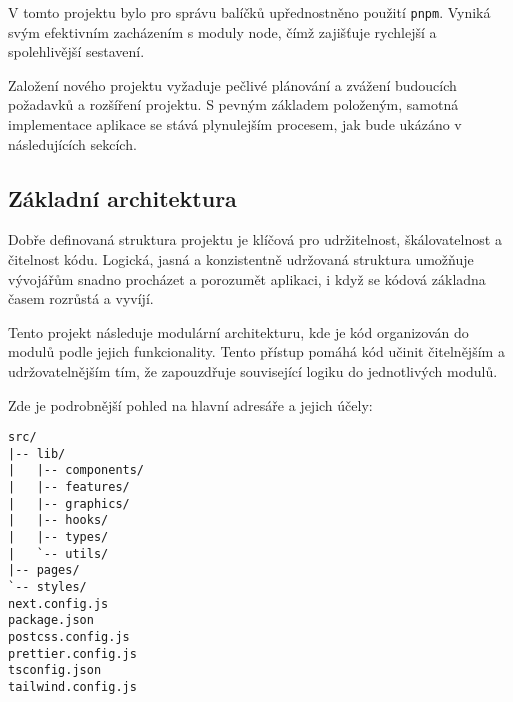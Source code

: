 V tomto projektu bylo pro správu balíčků upřednostněno použití \texttt{pnpm}.
Vyniká svým efektivním zacházením s moduly node, čímž zajišťuje rychlejší a spolehlivější sestavení.

Založení nového projektu vyžaduje pečlivé plánování a zvážení budoucích požadavků a rozšíření projektu.
S pevným základem položeným, samotná implementace aplikace se stává plynulejším procesem, jak bude ukázáno v následujících sekcích.

\subsection{Základní architektura}
\label{subsec:implementace-architektura-zakladni}
Dobře definovaná struktura projektu je klíčová pro udržitelnost, škálovatelnost a čitelnost kódu.
Logická, jasná a konzistentně udržovaná struktura umožňuje vývojářům snadno procházet a porozumět aplikaci, i když se kódová základna časem rozrůstá a vyvíjí.

Tento projekt následuje modulární architekturu, kde je kód organizován do modulů podle jejich funkcionality.
Tento přístup pomáhá kód učinit čitelnějším a udržovatelnějším tím, že zapouzdřuje související logiku do jednotlivých modulů.

Zde je podrobnější pohled na hlavní adresáře a jejich účely:

\begin{lstlisting}[language={[LaTeX]TeX},caption={Struktura projektu},label={lst:project-structure}]
src/
|-- lib/
|   |-- components/
|   |-- features/
|   |-- graphics/
|   |-- hooks/
|   |-- types/
|   `-- utils/
|-- pages/
`-- styles/
next.config.js
package.json
postcss.config.js
prettier.config.js
tsconfig.json
tailwind.config.js
\end{lstlisting}


